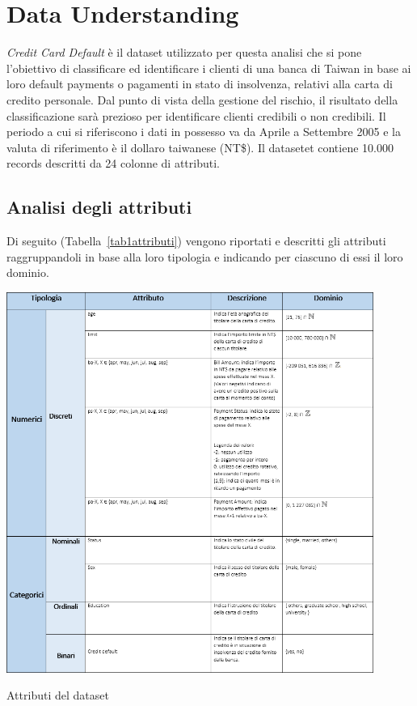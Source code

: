 \chapter{Data Understanding}

\textit{Credit Card Default} \`e il dataset utilizzato
per questa analisi che si pone l'obiettivo di classificare
ed identificare i clienti di una banca di Taiwan in base
ai loro default payments o pagamenti in stato di insolvenza,
relativi alla carta di credito personale. Dal punto di vista
della gestione del rischio, il risultato della classificazione
sar\`a prezioso per identificare clienti credibili o non credibili.
Il periodo a cui si riferiscono i dati in possesso va da Aprile
a Settembre 2005 e la valuta di riferimento \`e il dollaro
taiwanese (NT\$). Il datasetet contiene 10.000 records descritti
da 24 colonne di attributi.

\section{Analisi degli attributi}

Di seguito (Tabella~\ref{tab1attributi}) vengono riportati
e descritti gli attributi raggruppandoli in base alla loro
tipologia e indicando per ciascuno di essi il loro dominio.

\begin{table}[H]
	\centering
	\includegraphics[width=12cm]{img/tabella1-attributi.png}
	\caption[LOF entry]{Attributi del dataset}
	\label{tab1attributi}
\end{table} 


